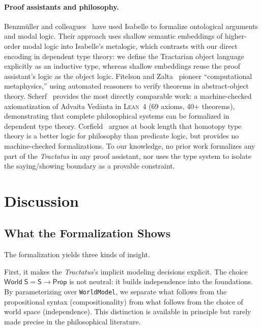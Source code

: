 \documentclass[10pt, letterpaper]{article}
\theoremstyle{definition}
\theoremstyle{remark}
\newcommand{\Sach}{\mathsf{S}}
\newcommand{\World}{\mathsf{World}}
\newcommand{\Prop}{\mathsf{Prop}}
\newcommand{\Lean}{\textsc{Lean}}
\begin{document}
\paragraph{Proof assistants and philosophy.}
Benzm\"uller and colleagues~\cite{benzmuller2017} have used
Isabelle to formalize ontological arguments and modal logic.
Their approach uses shallow semantic embeddings of higher-order
modal logic into Isabelle's metalogic, which contrasts with our
direct encoding in dependent type theory: we define the
Tractarian object language explicitly as an inductive type,
whereas shallow embeddings reuse the proof assistant's logic
as the object logic.
Fitelson and Zalta~\cite{fitelson2007} pioneer ``computational
metaphysics,'' using automated reasoners to verify theorems
in abstract-object theory.
Scherf~\cite{scherf2025} provides the most directly comparable
work: a machine-checked axiomatization of Advaita Ved\=anta in
\Lean~4 (69 axioms, 40+ theorems), demonstrating that complete
philosophical systems can be formalized in dependent type
theory.
Corfield~\cite{corfield2020} argues at book length that
homotopy type theory is a better logic for philosophy than
predicate logic, but provides no machine-checked formalizations.
To our knowledge, no prior work formalizes any part of the
\emph{Tractatus} in any proof assistant, nor uses the type
system to isolate the saying/showing boundary as a provable
constraint.

\section{Discussion}
\label{sec:discussion}

\subsection{What the Formalization Shows}
\label{sec:shows}

The formalization yields three kinds of insight.

First, it makes the \emph{Tractatus}'s implicit modeling
decisions explicit.  The choice $\World\;\Sach = \Sach \to
\Prop$ is not neutral: it builds independence into the
foundations.  By parameterizing over \texttt{WorldModel}, we
separate what follows from the propositional syntax (compositionality)
from what follows from the choice of world space (independence).
This distinction is available in principle but rarely made
precise in the philosophical literature.
\end{document}
